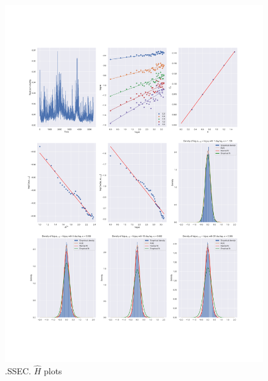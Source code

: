 	\begin{figure}[h]
		\centering
		\includegraphics[width=\linewidth]{fig/.SSEC.pdf}
		\caption{.SSEC. $\hat{H}$ plots}
	\end{figure}

